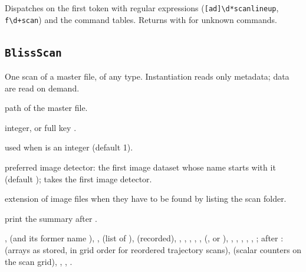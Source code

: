 Dispatches on the first token with regular expressions (\texttt{[ad]\textbackslash d*scan\textbar{}lineup},
\texttt{f\textbackslash d+scan}) and the command tables. Returns  with 
 for unknown commands.

\subsection{\texttt{BlissScan}}

One scan of a master file, of any type. Instantiation reads only metadata; data are read on
demand.
\begin{args}
\item[h5\_filepath] path of the master file.
\item[scan\_number] integer, or full key .
\item[subscan] used when  is an integer (default 1).
\item[image\_prefix] preferred image detector: the first image dataset whose name starts
  with it (default );  takes the first image detector.
\item[image\_suffix] extension of image files when they have to be found by listing the
  scan folder.
\item[verbose] print the summary after .
\end{args}
 ,  (and its former name ),
,  (list of ),  (recorded),
, , , , ,
 (,  or ), , , , ,
, ; after :  (arrays as stored,
in grid order for reordered trajectory scans),
 (scalar counters on the scan grid), , ,
.

